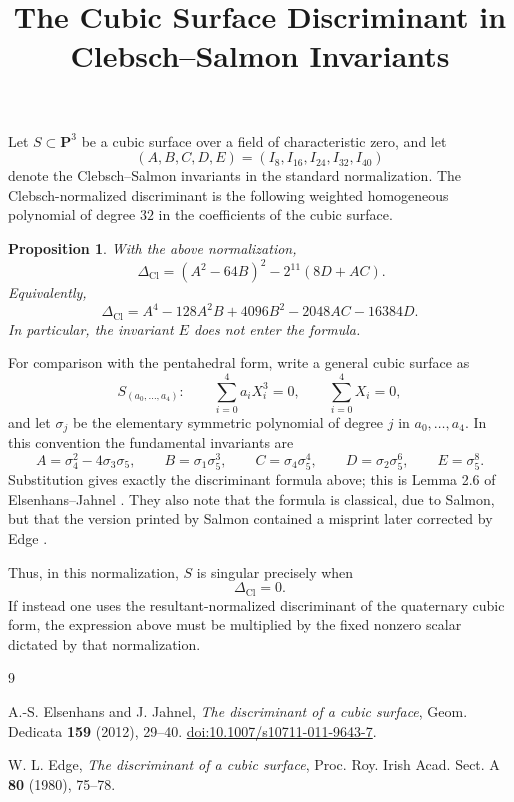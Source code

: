 \documentclass[11pt]{article}
\title{The Cubic Surface Discriminant in Clebsch--Salmon Invariants}
\author{}
\date{}
\newtheorem*{proposition}{Proposition}
\begin{document}
\maketitle

Let $S \subset \mathbf P^3$ be a cubic surface over a field of characteristic zero,
and let
\[
(A,B,C,D,E)=(I_8,I_{16},I_{24},I_{32},I_{40})
\]
denote the Clebsch--Salmon invariants in the standard normalization.  The
Clebsch-normalized discriminant is the following weighted homogeneous polynomial
of degree $32$ in the coefficients of the cubic surface.

\begin{proposition}
With the above normalization,
\[
\boxed{\
\Delta_{\mathrm{Cl}}
= (A^2-64B)^2 - 2^{11}(8D+AC).
}
\]
Equivalently,
\[
\Delta_{\mathrm{Cl}}
= A^4 - 128A^2B + 4096B^2 - 2048AC - 16384D.
\]
In particular, the invariant $E$ does not enter the formula.
\end{proposition}

For comparison with the pentahedral form, write a general cubic surface as
\[
S_{(a_0,\ldots,a_4)}:\qquad
\sum_{i=0}^4 a_i X_i^3=0,\qquad \sum_{i=0}^4 X_i=0,
\]
and let $\sigma_j$ be the elementary symmetric polynomial of degree $j$ in
$a_0,\ldots,a_4$.  In this convention the fundamental invariants are
\[
A=\sigma_4^2-4\sigma_3\sigma_5,
\qquad
B=\sigma_1\sigma_5^3,
\qquad
C=\sigma_4\sigma_5^4,
\qquad
D=\sigma_2\sigma_5^6,
\qquad
E=\sigma_5^8.
\]
Substitution gives exactly the discriminant formula above; this is Lemma 2.6
of Elsenhans--Jahnel \cite{EJ}.  They also note that the formula is classical,
due to Salmon, but that the version printed by Salmon contained a misprint later
corrected by Edge \cite{Edge}.

Thus, in this normalization, $S$ is singular precisely when
\[
\Delta_{\mathrm{Cl}}=0.
\]
If instead one uses the resultant-normalized discriminant of the quaternary cubic
form, the expression above must be multiplied by the fixed nonzero scalar dictated
by that normalization.

\begin{thebibliography}{9}

A.-S. Elsenhans and J. Jahnel,
\emph{The discriminant of a cubic surface},
Geom. Dedicata \textbf{159} (2012), 29--40.
\href{https://doi.org/10.1007/s10711-011-9643-7}{doi:10.1007/s10711-011-9643-7}.

W. L. Edge,
\emph{The discriminant of a cubic surface},
Proc. Roy. Irish Acad. Sect. A \textbf{80} (1980), 75--78.

\end{thebibliography}
\end{document}
